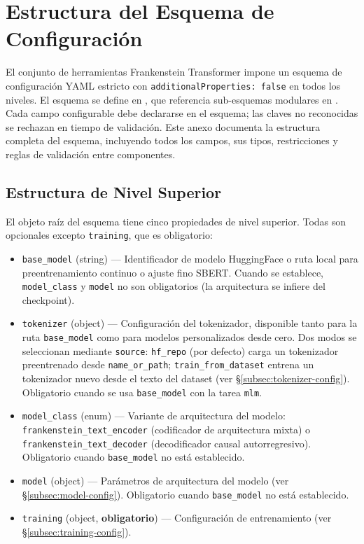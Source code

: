 \section{Estructura del Esquema de Configuración}
\label{sec:annex-schema}

El conjunto de herramientas Frankenstein Transformer impone un esquema de configuración YAML estricto con \texttt{additionalProperties: false} en todos los niveles. El esquema se define en , que referencia sub-esquemas modulares en . Cada campo configurable debe declararse en el esquema; las claves no reconocidas se rechazan en tiempo de validación. Este anexo documenta la estructura completa del esquema, incluyendo todos los campos, sus tipos, restricciones y reglas de validación entre componentes.

\subsection{Estructura de Nivel Superior}

El objeto raíz del esquema tiene cinco propiedades de nivel superior. Todas son opcionales excepto \texttt{training}, que es obligatorio:

\begin{itemize}[nosep]
    \item \texttt{base\_model} (string) --- Identificador de modelo HuggingFace o ruta local para preentrenamiento continuo o ajuste fino SBERT. Cuando se establece, \texttt{model\_class} y \texttt{model} no son obligatorios (la arquitectura se infiere del checkpoint).
    \item \texttt{tokenizer} (object) --- Configuración del tokenizador, disponible tanto para la ruta \texttt{base\_model} como para modelos personalizados desde cero. Dos modos se seleccionan mediante \texttt{source}: \texttt{hf\_repo} (por defecto) carga un tokenizador preentrenado desde \texttt{name\_or\_path}; \texttt{train\_from\_dataset} entrena un tokenizador nuevo desde el texto del dataset (ver \S\ref{subsec:tokenizer-config}). Obligatorio cuando se usa \texttt{base\_model} con la tarea \texttt{mlm}.
    \item \texttt{model\_class} (enum) --- Variante de arquitectura del modelo: \texttt{frankenstein\_text\_encoder} (codificador de arquitectura mixta) o \texttt{frankenstein\_text\_decoder} (decodificador causal autorregresivo). Obligatorio cuando \texttt{base\_model} no está establecido.
    \item \texttt{model} (object) --- Parámetros de arquitectura del modelo (ver \S\ref{subsec:model-config}). Obligatorio cuando \texttt{base\_model} no está establecido.
    \item \texttt{training} (object, \textbf{obligatorio}) --- Configuración de entrenamiento (ver \S\ref{subsec:training-config}).
\end{itemize}

